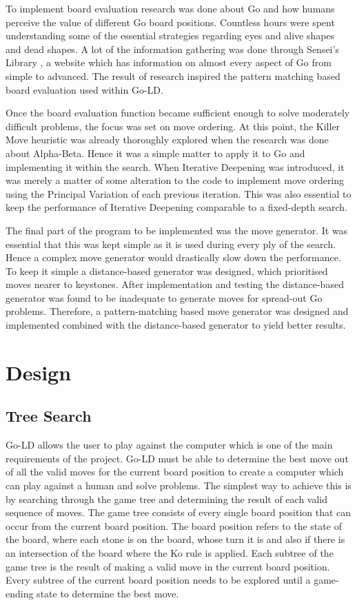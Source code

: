 \documentclass{l4proj}
\begin{document}
To implement board evaluation research was done about Go and how humans perceive the value of different Go board positions. Countless hours were spent understanding some of the essential strategies regarding eyes and alive shapes and dead shapes. A lot of the information gathering was done through Sensei’s Library , a website \citep{Senseis} which has information on almost every aspect of Go from simple to advanced. The result of research inspired the pattern matching based board evaluation used within Go-LD.

Once the board evaluation function became sufficient enough to solve moderately difficult problems, the focus was set on move ordering. At this point, the Killer Move heuristic was already thoroughly explored when the research was done about Alpha-Beta. Hence it was a simple matter to apply it to Go and implementing it within the search. When Iterative Deepening was introduced, it was merely a matter of some alteration to the code to implement move ordering using the Principal Variation of each previous iteration. This was also essential to keep the performance of Iterative Deepening comparable to a fixed-depth search.

The final part of the program to be implemented was the move generator. It was essential that this was kept simple as it is used during every ply of the search. Hence a complex move generator would drastically slow down the performance. To keep it simple a distance-based generator was designed, which prioritised moves nearer to keystones. After implementation and testing the distance-based generator was found to be inadequate to generate moves for spread-out Go problems. Therefore, a pattern-matching based move generator was designed and implemented combined with the distance-based generator to yield better results.








\chapter{Design}


\section{Tree Search}
Go-LD allows the user to play against the computer which is one of the main requirements of the project.  Go-LD must be able to determine the best move out of all the valid moves for the current board position to create a computer which can play against a human and solve problems. The simplest way to achieve this is by searching through the game tree and determining the result of each valid sequence of moves. The game tree consists of every single board position that can occur from the current board position. The board position refers to the state of the board, where each stone is on the board, whose turn it is and also if there is an intersection of the board where the Ko rule is applied. Each subtree of the game tree is the result of making a valid move in the current board position. Every subtree of the current board position needs to be explored until a game-ending state to determine the best move.
\end{document}
